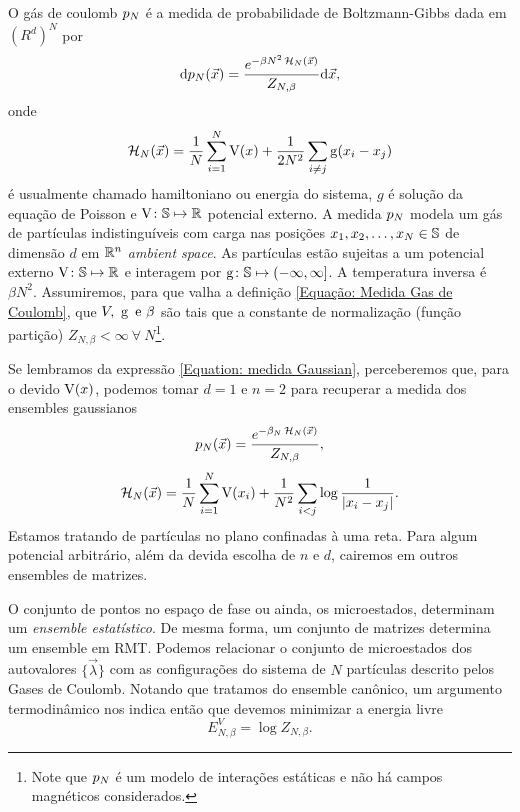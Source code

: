 \documentclass[12pt]{report}
\begin{document}
O gás de coulomb $p_N$ \cite{ChafaCoulombMeasure} é a medida de probabilidade de Boltzmann-Gibbs dada em $(R^d)^N$ por 
\begin{equation}
	\mathrm{d} p_N(\vec{x}) = \frac{e^{-\beta N^2 \operatorname{\mathcal{H}}_N(\vec{x})}}{Z_{N,\beta}} \mathrm{d} \vec{x},
	\label{Equação: Medida Gas de Coulomb}
\end{equation}
onde $$\operatorname{\mathcal{H}}_N(\vec{x}) = \frac{1}{N} \sum_{i = 1}^{N} \operatorname{V}(x) + \frac{1}{2N^2} \sum_{i \neq j} \operatorname{g}(x_i - x_j)$$ é usualmente chamado hamiltoniano ou energia do sistema, $g$ é solução da equação de Poisson e $\operatorname{V} \colon \mathbb{S} \mapsto \mathbb{R}$ potencial externo. A medida $p_N$ modela um gás de partículas indistinguíveis com carga nas posições $x_1, x_2, \dots, x_N \in \mathbb{S}$ de dimensão $d$ em $\mathbb{R}^n$ \textit{ambient space}. As partículas estão sujeitas a um potencial externo $\operatorname{V} \colon \mathbb{S} \mapsto \mathbb{R}$ e interagem por $\operatorname{g} \colon \mathbb{S} \mapsto (-\infty, \infty]$. A temperatura inversa é $\beta N^2$. Assumiremos, para que valha a definição \ref{Equação: Medida Gas de Coulomb}, que $V, \ \g \ \text{e} \ \beta$ são tais que a constante de normalização (função partição) $Z_{N, \beta} < \infty \ \forall \ N$\footnote{Note que $p_N$ é um modelo de interações estáticas e não há campos magnéticos considerados.}.

Se lembramos da expressão \ref{Equation: medida Gaussian}, perceberemos que, para o devido $\operatorname{V}(x)$, podemos tomar $d=1$ e $n = 2$ para recuperar a medida dos ensembles gaussianos 
\begin{equation}
	p_N(\vec{x}) = \frac{e^{-\beta_N \operatorname{\mathcal{H}}_N(\vec{x})}}{Z_{N,\beta}},
	\label{Equation: Medida Log V}
\end{equation}
\begin{equation}
	\operatorname{\mathcal{H}}_N(\vec{x}) = \frac{1}{N} \sum_{i = 1}^{N} \operatorname{V}(x_i) + \frac{1}{N^2} \sum_{i < j} \log{\frac{1}{|x_i - x_j|}}.
\end{equation}
Estamos tratando de partículas no plano confinadas à uma reta. Para algum potencial arbitrário, além da devida escolha de $n$ e $d$, cairemos em outros ensembles de matrizes.

O conjunto de pontos no espaço de fase ou ainda, os microestados, determinam um \textit{ensemble estatístico}. De mesma forma, um conjunto de matrizes determina um ensemble em RMT. Podemos relacionar o conjunto de microestados dos autovalores $\{\vec{\lambda}\}$ com as configurações do sistema de $N$ partículas descrito pelos Gases de Coulomb. Notando que tratamos do ensemble canônico, um argumento termodinâmico nos indica então que devemos minimizar a energia livre $$E^V_{N,\beta} = \log{Z_{N, \beta}}.$$
\end{document}
